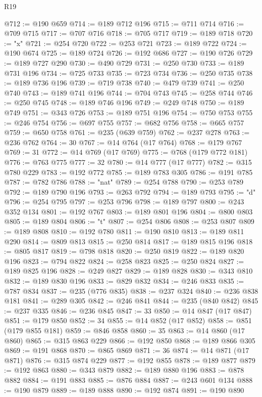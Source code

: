 \begin{lexlean}{R19}
\begin{coremodule}
@712 := @190 @659
@714 := @189 @712 @196
@715 := @711 @714
@716 := @709 @715
@717 := @707 @716
@718 := @705 @717
@719 := @189 @718
@720 := "x"
@721 := @254 @720
@722 := @253 @721
@723 := @189 @722
@724 := @190 @674
@725 := @189 @724
@726 := @192 @686
@727 := @190 @726
@729 := @189 @727 @290
@730 := @490 @729
@731 := @250 @730
@733 := @189 @731 @196
@734 := @725 @733
@735 := @723 @734
@736 := @250 @735
@738 := @189 @736 @196
@739 := @719 @738
@740 := @479 @739
@741 := @250 @740
@743 := @189 @741 @196
@744 := @704 @743
@745 := @258 @744
@746 := @250 @745
@748 := @189 @746 @196
@749 := @249 @748
@750 := @189 @749
@751 := @343 @726
@753 := @189 @751 @196
@754 := @750 @753
@755 := @246 @754
@756 := @697 @755
@757 := @682 @756
@758 := @665 @757
@759 := @650 @758
@761 := @235 (@639 @759)
@762 := @237 @278
@763 := @236 @762
@764 := 30
@767 := @14 @764 (@17 @764)
@768 := @179 @767
@769 := 31
@772 := @14 @769 (@17 @769)
@775 := @768 (@179 @772 @181)
@776 := @763 @775
@777 := 32
@780 := @14 @777 (@17 @777)
@782 := @315 @780 @229
@783 := @192 @772
@785 := @189 @783 @305
@786 := @191 @785
@787 := @782 @786
@788 := "nat"
@789 := @254 @788
@790 := @253 @789
@792 := @189 @790 @196
@793 := @263 @792
@794 := @189 @793
@795 := "d"
@796 := @254 @795
@797 := @253 @796
@798 := @189 @797
@800 := @243 @352 @134
@801 := @192 @767
@803 := @189 @801 @196
@804 := @800 @803
@805 := @189 @804
@806 := "t"
@807 := @254 @806
@808 := @253 @807
@809 := @189 @808
@810 := @192 @780
@811 := @190 @810
@813 := @189 @811 @290
@814 := @809 @813
@815 := @250 @814
@817 := @189 @815 @196
@818 := @805 @817
@819 := @798 @818
@820 := @250 @819
@822 := @189 @820 @196
@823 := @794 @822
@824 := @258 @823
@825 := @250 @824
@827 := @189 @825 @196
@828 := @249 @827
@829 := @189 @828
@830 := @343 @810
@832 := @189 @830 @196
@833 := @829 @832
@834 := @246 @833
@835 := @787 @834
@837 := @235 (@776 @835)
@838 := @237 @324
@840 := @236 @838 @181
@841 := @289 @305
@842 := @246 @841
@844 := @235 (@840 @842)
@845 := @237 @335
@846 := @236 @845
@847 := 33
@850 := @14 @847 (@17 @847)
@851 := @179 @850
@852 := 34
@855 := @14 @852 (@17 @852)
@858 := @851 (@179 @855 @181)
@859 := @846 @858
@860 := 35
@863 := @14 @860 (@17 @860)
@865 := @315 @863 @229
@866 := @192 @850
@868 := @189 @866 @305
@869 := @191 @868
@870 := @865 @869
@871 := 36
@874 := @14 @871 (@17 @871)
@876 := @315 @874 @229
@877 := @192 @855
@878 := @189 @877
@879 := @192 @863
@880 := @343 @879
@882 := @189 @880 @196
@883 := @878 @882
@884 := @191 @883
@885 := @876 @884
@887 := @243 @601 @134
@888 := @190 @879
@889 := @189 @888
@890 := @192 @874
@891 := @190 @890

\end{coremodule}
\end{lexlean}
